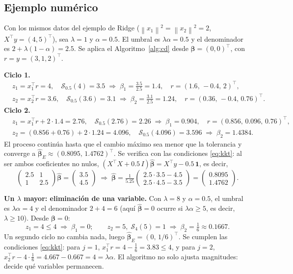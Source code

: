\documentclass[11pt,a4paper]{article}
\newcommand{\norm}[1]{\left\lVert #1 \right\rVert}
\newcommand{\bt}{\bm{\beta}}
\newcommand{\bh}{\hat{\bm{\beta}}}
\newcommand{\soft}{\mathcal{S}}
\theoremstyle{simple}
\begin{document}
\subsection{Ejemplo numérico}
Con los mismos datos del ejemplo de Ridge ($\norm{x_1}^2=\norm{x_2}^2=2$, $X^\top y=(4,5)^\top$), sea $\lambda=1$ y $\alpha=0.5$. El umbral es $\lambda\alpha=0.5$ y el denominador es $2+\lambda(1-\alpha)=2.5$. Se aplica el Algoritmo~\ref{alg:cd} desde $\bt=(0,0)^\top$, con $r=y=(3,1,2)^\top$.

\textbf{Ciclo 1.}
\[
\begin{aligned}
&z_1=x_1^\top r=4,\quad \soft_{0.5}(4)=3.5\;\Rightarrow\;\beta_1=\tfrac{3.5}{2.5}=1.4,\quad r=(1.6,\,-0.4,\,2)^\top,\\
&z_2=x_2^\top r=3.6,\quad \soft_{0.5}(3.6)=3.1\;\Rightarrow\;\beta_2=\tfrac{3.1}{2.5}=1.24,\quad r=(0.36,\,-0.4,\,0.76)^\top.
\end{aligned}
\]
\textbf{Ciclo 2.}
\[
\begin{aligned}
&z_1=x_1^\top r+2\cdot1.4=2.76,\quad \soft_{0.5}(2.76)=2.26\;\Rightarrow\;\beta_1=0.904,\quad r=(0.856,\,0.096,\,0.76)^\top,\\
&z_2=(0.856+0.76)+2\cdot1.24=4.096,\quad \soft_{0.5}(4.096)=3.596\;\Rightarrow\;\beta_2=1.4384.
\end{aligned}
\]
El proceso continúa hasta que el cambio máximo sea menor que la tolerancia y converge a $\bh_{E}\approx(0.8095,\,1.4762)^\top$. Se verifica con las condiciones \eqref{eq:kkt}: al ser ambos coeficientes no nulos, $(X^\top X+0.5\,I)\bh=X^\top y-0.5\,\mathbf 1$, es decir,
\[
\begin{pmatrix}2.5&1\\1&2.5\end{pmatrix}\bh=\begin{pmatrix}3.5\\4.5\end{pmatrix}\;\Longrightarrow\;\bh=\tfrac{1}{5.25}\begin{pmatrix}2.5\cdot3.5-4.5\\2.5\cdot4.5-3.5\end{pmatrix}=\begin{pmatrix}0.8095\\1.4762\end{pmatrix}.
\]

\textbf{Un $\lambda$ mayor: eliminación de una variable.} Con $\lambda=8$ y $\alpha=0.5$, el umbral es $\lambda\alpha=4$ y el denominador $2+4=6$ (aquí $\bh=0$ ocurre si $\lambda\alpha\ge5$, es decir, $\lambda\ge10$). Desde $\bt=0$:
\[
z_1=4\le4\;\Rightarrow\;\beta_1=0;\qquad z_2=5,\;\soft_4(5)=1\;\Rightarrow\;\beta_2=\tfrac16\approx0.1667 .
\]
Un segundo ciclo no cambia nada, luego $\bh_E=(0,\,1/6)^\top$. Se cumplen las condiciones \eqref{eq:kkt}: para $j=1$, $x_1^\top r=4-\tfrac16=3.83\le4$, y para $j=2$, $x_2^\top r-4\cdot\tfrac16=4.667-0.667=4=\lambda\alpha$. El algoritmo no solo ajusta magnitudes: decide qué variables permanecen.
\end{document}
